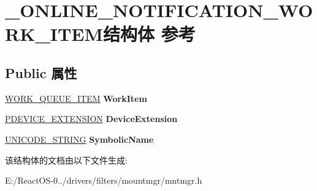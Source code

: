 \hypertarget{struct___o_n_l_i_n_e___n_o_t_i_f_i_c_a_t_i_o_n___w_o_r_k___i_t_e_m}{}\section{\+\_\+\+O\+N\+L\+I\+N\+E\+\_\+\+N\+O\+T\+I\+F\+I\+C\+A\+T\+I\+O\+N\+\_\+\+W\+O\+R\+K\+\_\+\+I\+T\+E\+M结构体 参考}
\label{struct___o_n_l_i_n_e___n_o_t_i_f_i_c_a_t_i_o_n___w_o_r_k___i_t_e_m}
\subsection*{Public 属性}
\begin{DoxyCompactItemize}
\item 
\mbox{\label{struct___o_n_l_i_n_e___n_o_t_i_f_i_c_a_t_i_o_n___w_o_r_k___i_t_e_m_a468e5b375f1fa00ca850fd5a1bc0825a}} 
\hyperlink{struct___w_o_r_k___q_u_e_u_e___i_t_e_m}{W\+O\+R\+K\+\_\+\+Q\+U\+E\+U\+E\+\_\+\+I\+T\+EM} {\bfseries Work\+Item}
\item 
\mbox{\label{struct___o_n_l_i_n_e___n_o_t_i_f_i_c_a_t_i_o_n___w_o_r_k___i_t_e_m_a105766ff35c1ac42d800a67e5815e2ee}} 
\hyperlink{struct___b_e_e_p___d_e_v_i_c_e___e_x_t_e_n_s_i_o_n}{P\+D\+E\+V\+I\+C\+E\+\_\+\+E\+X\+T\+E\+N\+S\+I\+ON} {\bfseries Device\+Extension}
\item 
\mbox{\label{struct___o_n_l_i_n_e___n_o_t_i_f_i_c_a_t_i_o_n___w_o_r_k___i_t_e_m_a4fe023f9682d1a3464572b2f9b1385cf}} 
\hyperlink{struct___u_n_i_c_o_d_e___s_t_r_i_n_g}{U\+N\+I\+C\+O\+D\+E\+\_\+\+S\+T\+R\+I\+NG} {\bfseries Symbolic\+Name}
\end{DoxyCompactItemize}


该结构体的文档由以下文件生成\+:\begin{DoxyCompactItemize}
\item 
E\+:/\+React\+O\+S-\/0../drivers/filters/mountmgr/mntmgr.\+h\end{DoxyCompactItemize}

